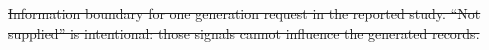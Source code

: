\documentclass[conference]{IEEEtran}
\providecommand{\DIFdeltex}[1]{{\protect\color{red}\sout{#1}}}                      %
\providecommand{\DIFdelFL}[1]{\DIFdel{#1}} %
\providecommand{\DIFdel}[1]{\texorpdfstring{\DIFdeltex{#1}}{}} %
\begin{document}
{%
\DIFdelFL{Information boundary for one generation request in the reported study. ``Not supplied'' is intentional: those signals cannot influence the generated records.}}
\end{document}
